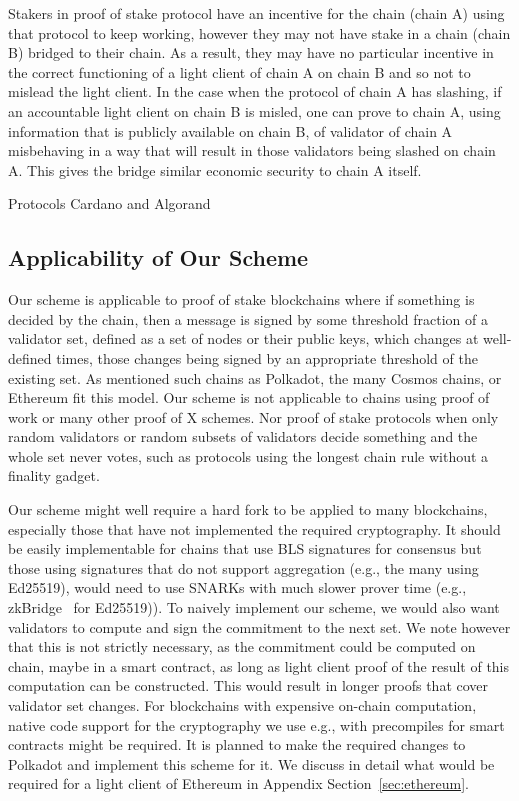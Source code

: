\noindent Stakers in proof of stake protocol have an incentive for the chain (chain A) using that protocol to keep working, however they may not have stake in a chain (chain B) bridged to their chain. As a result, they may have no particular incentive in the correct functioning of a light client of chain A on chain B and so not to mislead the light client. In the case when the protocol of chain A has slashing, if an accountable light client on chain B is misled, one can prove to chain A, using information that is publicly available on chain B, of validator of chain A misbehaving in a way that will result in those validators being slashed on chain A. This gives the bridge similar economic security to chain A itself.

Protocols Cardano and Algorand
\vspace{-0.08in}
\subsection{Applicability of Our Scheme}

\noindent Our scheme is applicable to proof of stake blockchains where if something is decided by the chain, then a message is signed by some threshold fraction of a validator set, defined as a set of nodes or their public keys, which changes at well-defined times, those changes being signed by an appropriate threshold of the existing set. As mentioned such chains as Polkadot, the many Cosmos chains, or Ethereum fit this model. Our scheme is not applicable to chains using proof of work or many other proof of X schemes. Nor proof of stake protocols when only random validators or random subsets of validators decide something and the whole set never votes, such as protocols using the longest chain rule without a finality gadget.

\noindent Our scheme might well require a hard fork to be applied to many blockchains, especially those that have not implemented the required cryptography. It should be easily implementable for chains that use BLS signatures for consensus but those using signatures that do not support aggregation (e.g., the many using Ed25519), would need to use SNARKs with much slower prover time (e.g., zkBridge~\cite{zkBridge} for Ed25519)). To naively implement our scheme, we would also want validators to compute and sign the commitment to the next set. We note however that this is not strictly necessary, as the commitment could be computed on chain, maybe in a smart contract, as long as light client proof of the result of this computation can be constructed. This would result in longer proofs that cover validator set changes. For blockchains with expensive on-chain computation, native code support for the cryptography we use e.g., with precompiles for smart contracts might be required. It is planned to make the required changes to Polkadot and implement this scheme for it. We discuss in detail what would be required for a light client of Ethereum in Appendix Section~\ref{sec:ethereum}.
\vspace{-0.1in}
